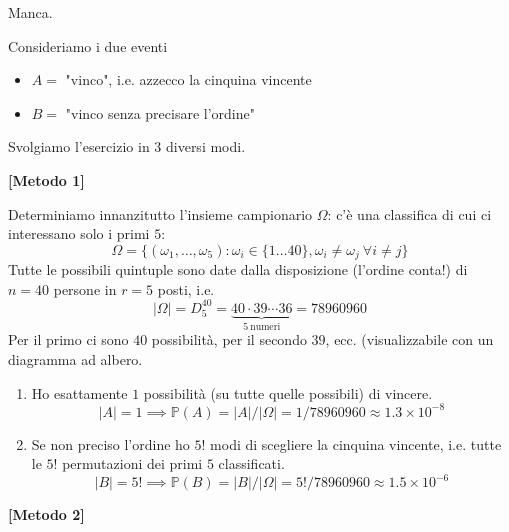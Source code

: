 Manca.
\Soluzione

Consideriamo i due eventi
\begin{itemize}
\item $A=$ "vinco", i.e. azzecco la cinquina vincente
\item $B=$ "vinco senza precisare l'ordine"
\end{itemize}

Svolgiamo l'esercizio in $3$ diversi modi.

\textbf{[Metodo 1]}

Determiniamo innanzitutto l'insieme campionario $\Omega $: c'è una classifica di cui ci interessano solo i primi $5$:
\begin{equation*}
\Omega =\{( \omega _{1} ,\dotsc ,\omega _{5}) :\omega _{i} \in \{1\dotsc 40\} ,\omega _{i} \neq \omega _{j} \ \forall i\neq j\}
\end{equation*}
Tutte le possibili quintuple sono date dalla disposizione (l'ordine conta!) di $n=40$ persone in $r=5$ posti, i.e.
\begin{equation*}
| \Omega | =D_{5}^{40} =\underbrace{40\cdot 39\cdots 36}_{5\ \text{numeri}} =78960960
\end{equation*}
Per il primo ci sono $40$ possibilità, per il secondo $39$, ecc. (visualizzabile con un diagramma ad albero.
\begin{enumerate}
\item Ho esattamente $1$ possibilità (su tutte quelle possibili) di vincere.\begin{equation*}
| A| =1\mathbb{\implies P}( A) =| A| /| \Omega | =1/78960960\approx 1.3\times 10^{-8}
\end{equation*}
\item Se non preciso l'ordine ho $5!$ modi di scegliere la cinquina vincente, i.e. tutte le $5!$ permutazioni dei primi $5$ classificati.\begin{equation*}
| B| =5!\mathbb{\implies P}( B) =| B| /| \Omega | =5!/78960960\approx 1.5\times 10^{-6}
\end{equation*}
\end{enumerate}

\textbf{[Metodo 2]}

